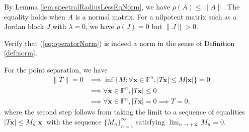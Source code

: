 \begin{rem}
  By Lemma \ref{lem:spectralRadiusLessEqNorm},
  we have $\rho(A)\le \|A\|$.
  The equality holds when $A$ is a normal matrix.
  For a nilpotent matrix such as a Jordan block $J$
  with $\lambda=0$,
  we have $\rho(J)=0$
  but $\|J\|>0$.
\end{rem}

\begin{exc}
  Verify that (\ref{eq:operatorNorm})
  is indeed a norm in the sense of Definition \ref{def:norm}.
\end{exc}
\begin{solution}
  For the point separation, we have
  \begin{displaymath}
    \begin{array}{rl}
    \|T\| = 0 & \implies \inf\{M: \forall \mathbf{x} \in
                \mathbb{F}^n, |T\mathbf{x}| \leq M|\mathbf{x}|\} =0
      \\ &\implies \forall \mathbf{x} \in \mathbb{F}^n,
           |T\mathbf{x}| \leq 0
      \\ &\implies \forall \mathbf{x} \in \mathbb{F}^n, |T\mathbf{x}| = 0 \implies T = 0,
    \end{array}
  \end{displaymath}
  where the second step follows from
  taking the limit to a sequence of equalities
  $|T\mathbf{x}|\le M_n |\mathbf{x}|$
  with the sequence $\{M_n\}_{n=1}^{\infty}$
  satisfying $\lim_{n\rightarrow +\infty} M_n = 0$.


\end{solution}
